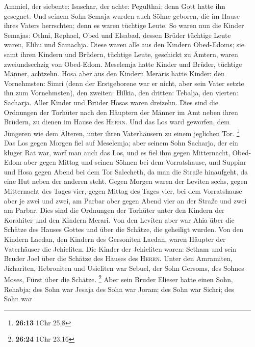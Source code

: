 Ammiel, der siebente: Isaschar, der achte: Pegulthai; denn Gott hatte
ihn gesegnet.  Und seinem Sohn Semaja wurden auch Söhne
geboren, die im Hause ihres Vaters herrschten; denn es waren tüchtige
Leute.  So waren nun die Kinder Semajas: Othni, Rephael,
Obed und Elsabad, dessen Brüder tüchtige Leute waren, Elihu und
Samachja.  Diese waren alle aus den Kindern Obed-Edoms;
sie samt ihren Kindern und Brüdern, tüchtige Leute, geschickt zu Ämtern,
waren zweiundsechzig von Obed-Edom.  Meselemja hatte
Kinder und Brüder, tüchtige Männer, achtzehn.  Hosa aber
aus den Kindern Meraris hatte Kinder: den Vornehmsten: Simri (denn der
Erstgeborene war er nicht, aber sein Vater setzte ihn zum Vornehmsten),
 den zweiten: Hilkia, den dritten: Tebalja, den vierten:
Sacharja. Aller Kinder und Brüder Hosas waren dreizehn. 
Dies sind die Ordnungen der Torhüter nach den Häuptern der Männer im Amt
neben ihren Brüdern, zu dienen im Hause des \textsc{Herrn}.
 Und das Los ward geworfen, dem Jüngeren wie dem Älteren,
unter ihren Vaterhäusern zu einem jeglichen Tor. \footnote{\textbf{26:13}
  1Chr 25,8}  Das Los gegen Morgen fiel auf Meselemja;
aber seinem Sohn Sacharja, der ein kluger Rat war, warf man auch das
Los, und es fiel ihm gegen Mitternacht,  Obed-Edom aber
gegen Mittag und seinen Söhnen bei dem Vorratshause,  und
Suppim und Hosa gegen Abend bei dem Tor Salecheth, da man die Straße
hinaufgeht, da eine Hut neben der anderen steht.  Gegen
Morgen waren der Leviten sechs, gegen Mitternacht des Tages vier, gegen
Mittag des Tages vier, bei dem Vorratshause aber je zwei und zwei,
 am Parbar aber gegen Abend vier an der Straße und zwei
am Parbar.  Dies sind die Ordnungen der Torhüter unter
den Kindern der Korahiter und den Kindern Merari.  Von
den Leviten aber war Ahia über die Schätze des Hauses Gottes und über
die Schätze, die geheiligt wurden.  Von den Kindern
Laedan, den Kindern des Gersoniten Laedan, waren Häupter der Vaterhäuser
die Jehieliten.  Die Kinder der Jehieliten waren: Setham
und sein Bruder Joel über die Schätze des Hauses des \textsc{Herrn}.
 Unter den Amramiten, Jizhariten, Hebroniten und
Usieliten  war Sebuel, der Sohn Gersoms, des Sohnes
Moses, Fürst über die Schätze. \footnote{\textbf{26:24} 1Chr 23,16}
 Aber sein Bruder Elieser hatte einen Sohn, Rehabja; des
Sohn war Jesaja des Sohn war Joram; des Sohn war Sichri; des Sohn war
